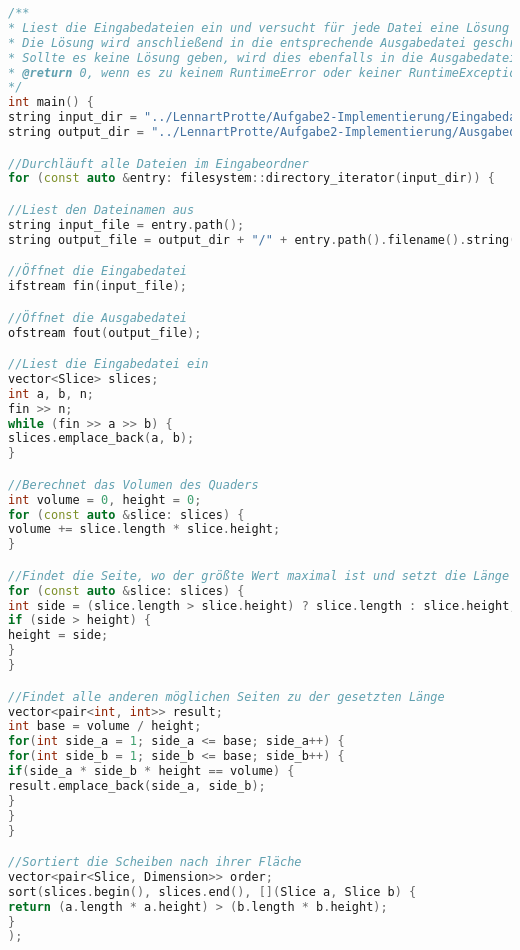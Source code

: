 \documentclass[a4paper,10pt,ngerman]{scrartcl}
\begin{document}
    \begin{lstlisting}[frame=single,language=C++,title=Methode main,breaklines=true,label={lst:code_main}]
/**
* Liest die Eingabedateien ein und versucht für jede Datei eine Lösung entsprechend der Aufgabenstellung zu finden
* Die Lösung wird anschließend in die entsprechende Ausgabedatei geschrieben
* Sollte es keine Lösung geben, wird dies ebenfalls in die Ausgabedatei geschrieben
* @return 0, wenn es zu keinem RuntimeError oder keiner RuntimeException gekommen ist
*/
int main() {
string input_dir = "../LennartProtte/Aufgabe2-Implementierung/Eingabedateien";
string output_dir = "../LennartProtte/Aufgabe2-Implementierung/Ausgabedateien";

//Durchläuft alle Dateien im Eingabeordner
for (const auto &entry: filesystem::directory_iterator(input_dir)) {

//Liest den Dateinamen aus
string input_file = entry.path();
string output_file = output_dir + "/" + entry.path().filename().string();

//Öffnet die Eingabedatei
ifstream fin(input_file);

//Öffnet die Ausgabedatei
ofstream fout(output_file);

//Liest die Eingabedatei ein
vector<Slice> slices;
int a, b, n;
fin >> n;
while (fin >> a >> b) {
slices.emplace_back(a, b);
}

//Berechnet das Volumen des Quaders
int volume = 0, height = 0;
for (const auto &slice: slices) {
volume += slice.length * slice.height;
}

//Findet die Seite, wo der größte Wert maximal ist und setzt die Länge auf diesen Wert
for (const auto &slice: slices) {
int side = (slice.length > slice.height) ? slice.length : slice.height;
if (side > height) {
height = side;
}
}

//Findet alle anderen möglichen Seiten zu der gesetzten Länge
vector<pair<int, int>> result;
int base = volume / height;
for(int side_a = 1; side_a <= base; side_a++) {
for(int side_b = 1; side_b <= base; side_b++) {
if(side_a * side_b * height == volume) {
result.emplace_back(side_a, side_b);
}
}
}

//Sortiert die Scheiben nach ihrer Fläche
vector<pair<Slice, Dimension>> order;
sort(slices.begin(), slices.end(), [](Slice a, Slice b) {
return (a.length * a.height) > (b.length * b.height);
}
);


\end{lstlisting}
\end{document}
